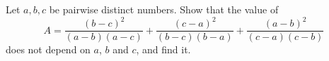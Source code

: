 Let $a,b,c$ be pairwise distinct numbers. Show that the value of
\[
A=\dfrac{(b-c)^2}{(a-b)(a-c)}+\dfrac{(c-a)^2}{(b-c)(b-a)}+\dfrac{(a-b)^2}{(c-a)(c-b)}
\]
does not depend on $a$, $b$ and $c$, and find it.
